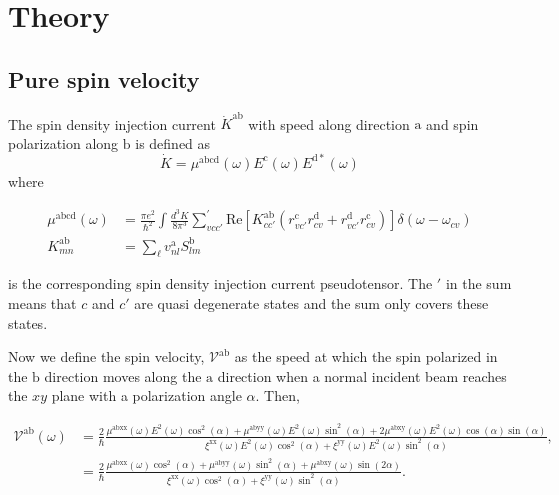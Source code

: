 \documentclass[prb,11pt,tightenlines,twocolumn,aps]{revtex4-1}
\begin{document}
\section{Theory} %
\label{sec:theory}




\subsection{Pure spin velocity} %
\label{sec:theory-pure_spin_current}

The spin density injection current $\dot{K}^{\mathrm{ab}}$ with speed along
direction $\mathrm{a}$ and spin polarization along $\mathrm{b}$ is defined as
\begin{equation}
\dot{K} = \mu^{\mathrm{abcd}}(\omega)
E^{\mathrm{c}}(\omega) E^{\mathrm{d*}}(\omega)
\label{eq:dotk}
\end{equation}
where
\begin{widetext}
\begin{align}
\mu^{\mathrm{abcd}} (\omega) 
&=
\frac{\pi e^{2}}{\hbar^{2}} \int 
\frac{d^{3}K}{8 \pi^{3}} \sum_{vcc'}^{'}
\mathrm{Re} \left[ K^{\mathrm{ab}}_{cc'} ( 
r^{\mathrm{c}}_{vc'} 
r^{\mathrm{d}}_{cv } +
r^{\mathrm{d}}_{vc'} 
r^{\mathrm{c}}_{cv } ) \right]
\delta(\omega-\omega_{cv})
\label{eq:mu}
\\
K^{\mathrm{ab}}_{mn}
&=
\sum_{\ell}v^{\mathrm{a}}_{nl} S^{\mathrm{b}}_{lm}
\label{eq:velspi-matelem}
\end{align}
\end{widetext}
is the corresponding spin density injection current pseudotensor. The $'$
in the sum means that $c$ and $c'$ are quasi degenerate states and the sum only
covers these states.

Now we define the spin velocity, $\mathcal{V}^{\mathrm{ab}}$ as the speed at
which the spin polarized in the $\mathrm{b}$   direction moves along the
$\mathrm{a}$ direction when a normal incident beam reaches the $xy$ plane with a
polarization angle $\alpha$. Then,
\begin{widetext}
\begin{align}
\mathcal{V}^{\mathrm{ab}} (\omega) 
&= \frac{2}{\hbar}
\frac{\mu^{\mathrm{abxx}}(\omega)
E^{2}(\omega)\cos^{2}(\alpha) + 
\mu^{\mathrm{abyy}}(\omega)
E^{2}(\omega)\sin^{2}(\alpha) + 
2\mu^{\mathrm{abxy}}(\omega)
E^{2}(\omega)\cos(\alpha)\sin(\alpha)}
{\xi^{\mathrm{xx}}(\omega)
E^{2}(\omega)\cos^{2}(\alpha) + 
\xi^{\mathrm{yy}}(\omega)
E^{2}(\omega)\sin^{2}(\alpha)},
\nonumber \\
&= \frac{2}{\hbar}
\frac{\mu^{\mathrm{abxx}}(\omega)\cos^{2}(\alpha) + 
\mu^{\mathrm{abyy}}(\omega)\sin^{2}(\alpha) + 
\mu^{\mathrm{abxy}}(\omega)\sin(2\alpha)}
{\xi^{\mathrm{xx}}(\omega)\cos^{2}(\alpha) + 
\xi^{\mathrm{yy}}(\omega)\sin^{2}(\alpha)}.
\label{eq:vab}
\end{align}
\end{widetext}
\end{document}
